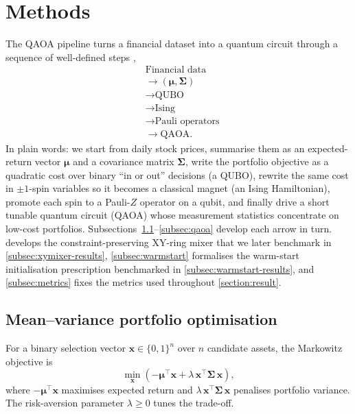 \section{Methods}\label{section:methods}

The QAOA pipeline turns a financial dataset into a quantum circuit through a sequence of well-defined steps \parencite{hjorthjensen2026quantumcomputingmachinelearning},
\begin{align*}
    & \text{Financial data} \\ 
    & \rightarrow (\boldsymbol\mu,\boldsymbol\Sigma) \\
    & \rightarrow \text{QUBO} \\
    & \rightarrow \text{Ising} \\
    & \rightarrow \text{Pauli operators} \\
    & \rightarrow \text{QAOA}.
\end{align*}
In plain words: we start from daily stock prices, summarise them as an expected-return vector $\boldsymbol\mu$ and a covariance matrix $\boldsymbol\Sigma$, write the portfolio objective as a quadratic cost over binary ``in or out'' decisions (a QUBO), rewrite the same cost in $\pm 1$-spin variables so it becomes a classical magnet (an Ising Hamiltonian), promote each spin to a Pauli-$Z$ operator on a qubit, and finally drive a short tunable quantum circuit (QAOA) whose measurement statistics concentrate on low-cost portfolios. Subsections~\ref{subsec:meanvar}--\ref{subsec:qaoa} develop each arrow in turn.  develops the constraint-preserving XY-ring mixer that we later benchmark in \cref{subsec:xymixer-results}, \cref{subsec:warmstart} formalises the warm-start initialisation prescription benchmarked in \cref{subsec:warmstart-results}, and \cref{subsec:metrics} fixes the metrics used throughout \cref{section:result}.


\subsection{Mean--variance portfolio optimisation}\label{subsec:meanvar}

For a binary selection vector $\boldsymbol{x} \in \{0,1\}^n$ over $n$ candidate assets, the Markowitz objective \autocite{markowitz1952} is
\begin{equation}
    \min_{\boldsymbol{x}} \left( -\boldsymbol\mu^\top \boldsymbol{x} + \lambda\, \boldsymbol{x}^\top \boldsymbol\Sigma\, \boldsymbol{x} \right),
\end{equation}
where $-\boldsymbol\mu^\top \boldsymbol{x}$ maximises expected return and $\lambda\, \boldsymbol{x}^\top \boldsymbol\Sigma\, \boldsymbol{x}$ penalises portfolio variance. The risk-aversion parameter $\lambda \geq 0$ tunes the trade-off.

